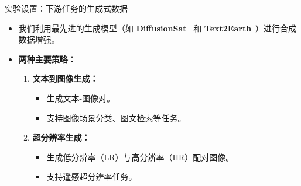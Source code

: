  \begin{refsection}
    \begin{frame}{实验设置：下游任务的生成式数据}
      \begin{itemize}
        \item 我们利用最先进的生成模型（如 \textbf{DiffusionSat}~\parencite{diffusionset2024} 和 \textbf{Text2Earth}~\parencite{text2earth2025}）进行合成数据增强。
        \item \textbf{两种主要策略：}
        \begin{enumerate}
          \item \textbf{文本到图像生成：}
            \begin{itemize}
              \item 生成文本-图像对。
              \item 支持图像场景分类、图文检索等任务。
            \end{itemize}
          \item \textbf{超分辨率生成：}
            \begin{itemize}
              \item 生成低分辨率（LR）与高分辨率（HR）配对图像。
              \item 支持遥感超分辨率任务。
            \end{itemize}
        \end{enumerate}
      \end{itemize}
      \vspace{1em}
      \bottomleftrefs
    \end{frame}
    \end{refsection}


  
